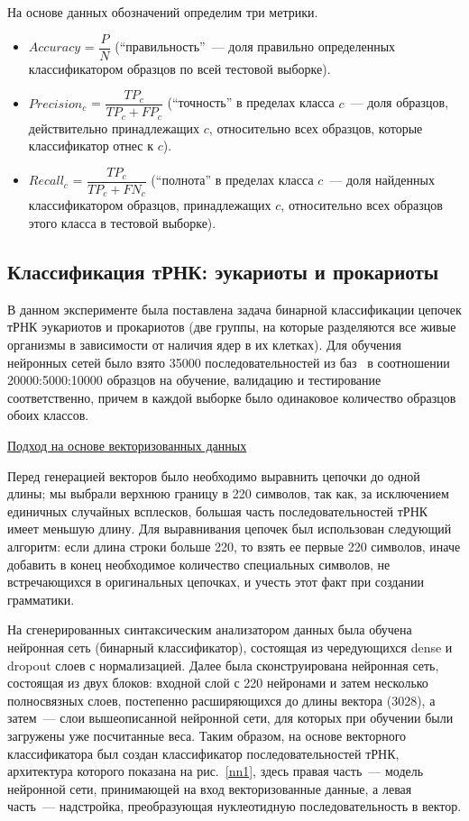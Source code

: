 На основе данных обозначений определим три метрики.
\begin{itemize}
    \item $Accuracy$ = $\dfrac{P}{N}$ (``правильность''~--- доля правильно определенных классификатором образцов по всей тестовой выборке).
    \item $Precision_{c}$ = $\dfrac{TP_{c}}{TP_{c} + FP_{c}}$ (``точность'' в пределах класса $c$~--- доля образцов, действительно принадлежащих $c$, относительно всех образцов, которые классификатор отнес к $c$).
    \item $Recall_{c}$ = $\dfrac{TP_{c}}{TP_{c} + FN_{c}}$  (``полнота'' в пределах класса $c$~--- доля найденных классификатором образцов, принадлежащих $c$, относительно всех образцов этого класса в тестовой выборке).
\end{itemize}


\subsection{Классификация тРНК: эукариоты и прокариоты}
В данном эксперименте была поставлена задача бинарной классификации цепочек тРНК эукариотов и прокариотов (две группы, на которые разделяются все живые организмы в зависимости от наличия ядер в их клетках). Для обучения нейронных сетей было взято 35000 последовательностей из баз~\cite{trnadb1,trnadb2} в соотношении 20000:5000:10000  образцов на обучение, валидацию и тестирование соответственно, причем в каждой выборке было одинаковое количество образцов обоих классов.

\underline{Подход на основе векторизованных данных}

Перед генерацией векторов было необходимо выравнить цепочки до одной длины; мы выбрали верхнюю границу в 220 символов, так как, за исключением единичных случайных всплесков, большая часть последовательностей тРНК имеет меньшую длину. Для выравнивания цепочек был использован следующий алгоритм: если длина строки больше 220, то взять ее первые 220 символов, иначе добавить в конец необходимое количество специальных символов, не встречающихся в оригинальных цепочках, и учесть этот факт при создании грамматики.

На сгенерированных синтаксическим анализатором данных была обучена нейронная сеть (бинарный классификатор), состоящая из чередующихся dense и dropout слоев с нормализацией. Далее была сконструирована нейронная сеть, состоящая из двух блоков: входной слой с 220 нейронами и затем несколько полносвязных слоев, постепенно расширяющихся до длины вектора (3028), а затем~--- слои вышеописанной нейронной сети, для которых при обучении были загружены уже посчитанные веса. Таким образом, на основе векторного классификатора был создан классификатор последовательностей тРНК, архитектура которого показана на рис.~\ref{nn1}, здесь правая часть~--- модель нейронной сети, принимающей на вход векторизованные данные, а левая часть~--- надстройка, преобразующая нуклеотидную последовательность в вектор.

